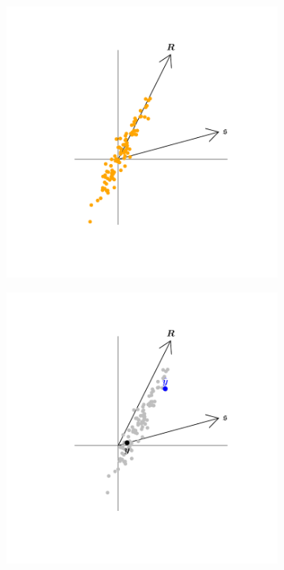\documentclass[12pt]{article}
\theoremstyle{definition}
\begin{document}
\begin{figure}[H]
    \centering
    \begin{subfigure}[!h]{0.48\textwidth}
        \includegraphics[width=\textwidth]{Figs/InsampDir_1_George.pdf}
        \caption{}
    \end{subfigure}
    \begin{subfigure}[!h]{0.48\textwidth}
        \includegraphics[width=\textwidth]{Figs/InsampDir_2_George.pdf}

\end{subfigure}
\end{figure}
\end{document}
